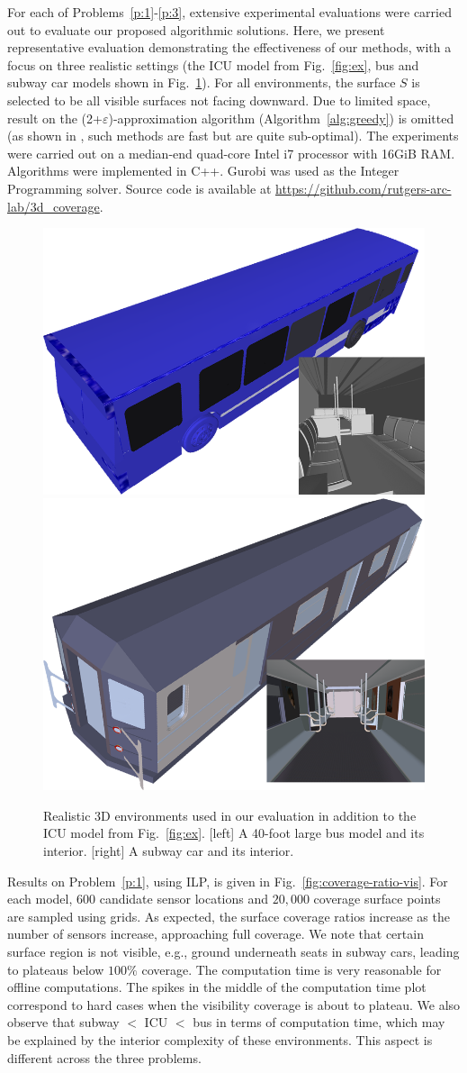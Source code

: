 For each of Problems~\ref{p:1}-\ref{p:3}, extensive experimental evaluations were carried out to evaluate our proposed algorithmic solutions. Here, we present representative evaluation demonstrating the effectiveness of our methods, with a focus on three realistic settings (the ICU model from Fig.~\ref{fig:ex}, bus and subway car models shown in Fig.~\ref{fig:bus-subway}). %
For all environments, the surface $S$ is selected to be all visible surfaces not facing downward.
Due to limited space, result on the (2+$\varepsilon$)-approximation algorithm (Algorithm~\ref{alg:greedy}) is omitted (as shown in \cite{FenYuRSS20}, such methods are fast but are quite sub-optimal). The experiments were carried out on a median-end quad-core Intel i7 processor with 16GiB RAM. 
Algorithms were implemented in C++. Gurobi \cite{gurobi} was used as the Integer Programming solver. 
Source code is available at 
{\small \url{https://github.com/rutgers-arc-lab/3d_coverage}}.

\begin{figure}[!ht]
    \centering
    \includegraphics[width = .4\columnwidth]{chapters/surf/fig/bus.png}\hspace{3mm}
    \includegraphics[width = .4\columnwidth]{chapters/surf/fig/subway.png}
    \caption{Realistic 3D environments used in our evaluation in addition to the ICU model from Fig.~\ref{fig:ex}. [left] A 40-foot large bus model and its interior. [right] A subway car and its interior.}
    \label{fig:bus-subway}
\end{figure}

Results on Problem~\ref{p:1}, using ILP, is given in Fig.~\ref{fig:coverage-ratio-vis}. 
For each model, $600$ candidate sensor locations and $20,000$ coverage surface points are sampled using grids. 
As expected, the surface coverage ratios increase as the number of sensors increase, approaching full coverage. We note that certain surface region is not visible, e.g., ground underneath seats in subway cars, leading to plateaus below $100\%$ coverage. The computation time is very reasonable for offline computations. The spikes in the middle of the computation time plot correspond to hard cases when the visibility coverage is about to plateau. We also observe that subway $<$ ICU $<$ bus in terms 
of computation time, which may be explained by the interior complexity of these environments. This aspect is different across the three problems.

